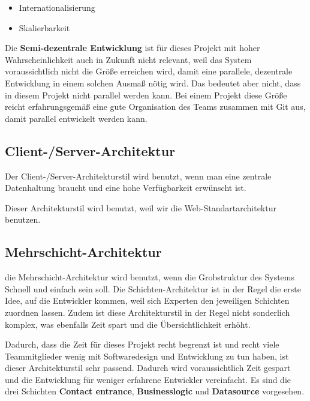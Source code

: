 \begin{itemize}
	\item Internationalisierung
	\item Skalierbarkeit
\end{itemize}

Die \textbf{Semi-dezentrale Entwicklung} ist für dieses Projekt mit hoher Wahrscheinlichkeit auch in Zukunft nicht relevant, weil das System voraussichtlich nicht die Größe erreichen wird, damit eine parallele, dezentrale Entwicklung in einem solchen Ausmaß nötig wird. Das bedeutet aber nicht, dass in diesem Projekt nicht parallel werden kann. Bei einem Projekt diese Größe reicht erfahrungsgemäß eine gute Organisation des Teams zusammen mit Git aus, damit parallel entwickelt werden kann.

\vspace{18pt}

\subsection{Client-/Server-Architektur}
Der Client-/Server-Architekturstil wird benutzt, wenn man eine zentrale Datenhaltung braucht und eine hohe Verfügbarkeit erwünscht ist. 

\vspace{6pt}

Dieser Architekturstil wird benutzt, weil wir die Web-Standartarchitektur benutzen.

\vspace{18pt}

\subsection{Mehrschicht-Architektur}
die Mehrschicht-Architektur wird benutzt, wenn die Grobstruktur des Systems Schnell und einfach sein soll. Die Schichten-Architektur ist in der Regel die erste Idee, auf die Entwickler kommen, weil sich Experten den jeweiligen Schichten zuordnen lassen. Zudem ist diese Architekturstil in der Regel nicht sonderlich komplex, was ebenfalls Zeit spart und die Übersichtlichkeit erhöht. 

\vspace{6pt}

Dadurch, dass die Zeit für dieses Projekt recht begrenzt ist und recht viele Teammitglieder wenig mit Softwaredesign und Entwicklung zu tun haben, ist dieser Architekturstil sehr passend. Dadurch wird voraussichtlich Zeit gespart und die Entwicklung für weniger erfahrene Entwickler vereinfacht. Es sind die drei Schichten \textbf{Contact entrance}, \textbf{Businesslogic} und \textbf{Datasource} vorgesehen. 

